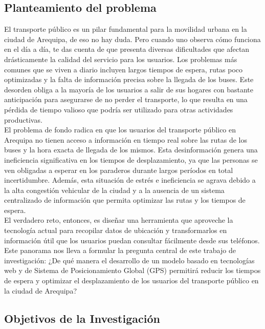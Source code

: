 \subsection{Planteamiento del problema}

El transporte público es un pilar fundamental para la movilidad urbana en la ciudad de Arequipa, de eso no hay duda. Pero cuando uno observa cómo funciona en el día a día, te das cuenta de que presenta diversas dificultades que afectan drásticamente la calidad del servicio para los usuarios. Los problemas más comunes que se viven a diario incluyen largos tiempos de espera, rutas poco optimizadas y la falta de información precisa sobre la llegada de los buses. Este desorden obliga a la mayoría de los usuarios a salir de sus hogares con bastante anticipación para asegurarse de no perder el transporte, lo que resulta en una pérdida de tiempo valioso que podría ser utilizado para otras actividades productivas.
\\
El problema de fondo radica en que los usuarios del transporte público en Arequipa no tienen acceso a información en tiempo real sobre las rutas de los buses y la hora exacta de llegada de los mismos. Esta desinformación genera una ineficiencia significativa en los tiempos de desplazamiento, ya que las personas se ven obligadas a esperar en los paraderos durante largos períodos en total incertidumbre. Además, esta situación de estrés e ineficiencia se agrava debido a la alta congestión vehicular de la ciudad y a la ausencia de un sistema centralizado de información que permita optimizar las rutas y los tiempos de espera.
\\
El verdadero reto, entonces, es diseñar una herramienta que aproveche la tecnología actual para recopilar datos de ubicación y transformarlos en información útil que los usuarios puedan consultar fácilmente desde sus teléfonos.
\\
Este panorama nos lleva a formular la pregunta central de este trabajo de investigación: ¿De qué manera el desarrollo de un modelo basado en tecnologías web y de Sistema de Posicionamiento Global (GPS) permitirá reducir los tiempos de espera y optimizar el desplazamiento de los usuarios del transporte público en la ciudad de Arequipa?

\subsection{Objetivos de la Investigación}

